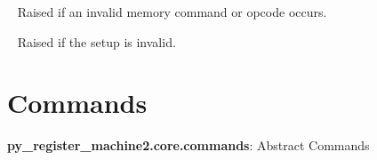 \documentclass[letterpaper,10pt,english]{sphinxmanual}
\begin{document}

\begin{fulllineitems}
\label{core:py_register_machine2.core.processor.SIGSEGV}~\label{core:sigsegv}
Raised if an invalid memory command or opcode occurs.

\end{fulllineitems}


\begin{fulllineitems}
\label{core:py_register_machine2.core.processor.SetupError}~\label{core:setuperror}
Raised if the setup is invalid.

\end{fulllineitems}



\section{Commands}
\label{core:commands}\label{core:module-py_register_machine2.core.commands}
\textbf{py\_register\_machine2.core.commands}: Abstract Commands
\end{document}
